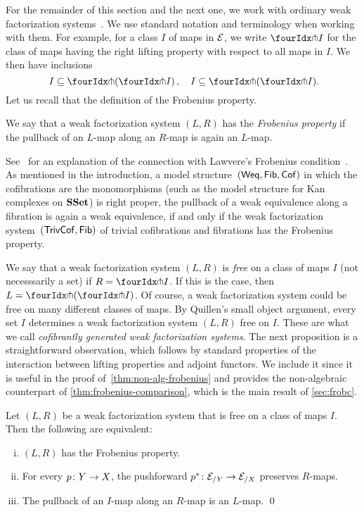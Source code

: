 \documentclass[reqno,10pt,a4paper,oneside,draft]{amsart}
\begin{document}
For the remainder of this section and the next one, we work with ordinary weak factorization systems~\cite{bousfield-wfs}. We use standard notation and terminology when working with them. For example, for a class $I$ of maps in $\cal{E}$, we write $\liftr{I}$ for the class of maps having the right lifting property with respect to all maps in $I$. We then have inclusions
\begin{equation}
\label{equ:inclus-orthog}
I \subseteq \liftl{(\liftr{I})} \, , \quad 
I \subseteq \liftr{(\liftl{I})} \rlap{.}
\end{equation}
Let us recall that the definition of the Frobenius property.
  
  \begin{definition} We say that a weak factorization system $(L, R)$ has the \emph{Frobenius property} if the pullback of an $L$-map along  an $R$-map is again an $L$-map. 
  \end{definition} 
  
  See~\cite{clementino:frobenius} for an explanation of the connection with Lawvere's Frobenius condition~\cite{lawvere-equality}.  As mentioned in the introduction, a model structure~$(\mathsf{Weq}, \Fib, \Cof)$ in which the cofibrations are the monomorphisms (such as the model structure for Kan complexes
  on $\SSet$) is right proper, \ie the pullback of a weak equivalence along a fibration is again a weak equivalence, 
if and only if the weak factorization system~$(\TrivCof, \Fib)$ of trivial cofibrations and fibrations has the Frobenius property. 

We say that a weak factorization system $(L, R)$ is \emph{free} on a class of maps $I$ (not necesssarily a set) if $R = \liftr{I}$. If this is the case, then $L = \liftl{(\liftr{I})}$.  
Of course, a weak factorization system could be free on many different classes of maps.  By Quillen's 
small object argument, every set $I$ determines a weak factorization system $(L, R)$ free on $I$. These are what we call \emph{cofibrantly generated weak factorization systems}. 
The next proposition is a straightforward observation, which follows by standard properties of the interaction between lifting properties and adjoint functors. We include it since it is useful
in the proof of~\cref{thm:non-alg-frobenius} and provides the non-algebraic counterpart of \cref{thm:frobenius-comparison}, which is the main result of \cref{sec:frobc}. 



\begin{proposition} 
\label{thm:frobenius-equivalence}
Let $(L, R)$ be a weak factorization system that is free on a class of maps $I$. Then the following are equivalent:
\begin{enumerate}[(i)] 
\item $(L,R)$ has the Frobenius property. 
\item For every $p \co Y \to X$, the pushforward $p^* \co \cal{E}_{/Y} \to \cal{E}_{/X}$ preserves $R$-maps.
\item The pullback of an $I$-map along 
an $R$-map is an $L$-map. \qed
\end{enumerate}
\end{proposition} 
\end{document}
